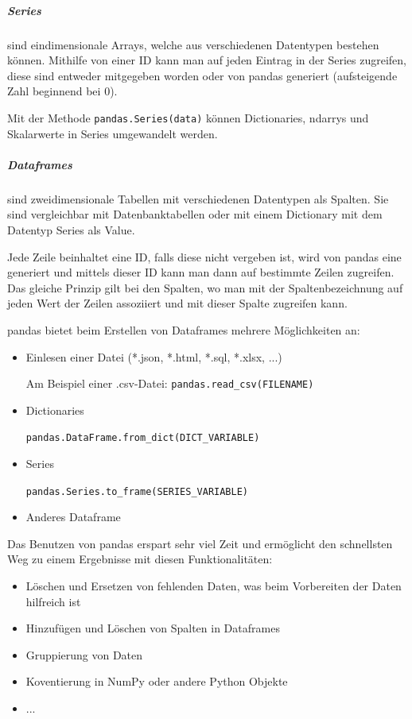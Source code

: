 \subparagraph{Series} sind eindimensionale Arrays, welche aus verschiedenen Datentypen bestehen können. Mithilfe von einer ID kann man auf jeden Eintrag in der Series zugreifen, diese sind entweder mitgegeben worden oder von pandas generiert (aufsteigende Zahl beginnend bei 0).

Mit der Methode \lstinline!pandas.Series(data)! können Dictionaries, ndarrys und Skalarwerte in Series umgewandelt werden.

\subparagraph{Dataframes} sind zweidimensionale Tabellen mit verschiedenen Datentypen als Spalten. Sie sind vergleichbar mit Datenbanktabellen oder mit einem Dictionary mit dem Datentyp Series als Value.

Jede Zeile beinhaltet eine ID, falls diese nicht vergeben ist, wird von pandas eine generiert und mittels dieser ID kann man dann auf bestimmte Zeilen zugreifen. Das gleiche Prinzip gilt bei den Spalten, wo man mit der Spaltenbezeichnung auf jeden Wert der Zeilen assoziiert und mit dieser Spalte zugreifen kann.

pandas bietet beim Erstellen von Dataframes mehrere Möglichkeiten an: \cite{pandas}

\begin{itemize}
    \item Einlesen einer Datei (*.json, *.html, *.sql, *.xlsx, ...)

          Am Beispiel einer .csv-Datei: \lstinline!pandas.read_csv(FILENAME)!
    \item Dictionaries

          \lstinline!pandas.DataFrame.from_dict(DICT_VARIABLE)!
    \item Series

          \lstinline!pandas.Series.to_frame(SERIES_VARIABLE)!
    \item Anderes Dataframe
\end{itemize}

Das Benutzen von pandas erspart sehr viel Zeit und ermöglicht den schnellsten Weg zu einem Ergebnisse mit diesen Funktionalitäten:

\begin{itemize}
    \item Löschen und Ersetzen von fehlenden Daten, was beim Vorbereiten der Daten hilfreich ist 
    \item Hinzufügen und Löschen von Spalten in Dataframes
    \item Gruppierung von Daten
    \item Koventierung in NumPy oder andere Python Objekte
    \item ...
\end{itemize}

